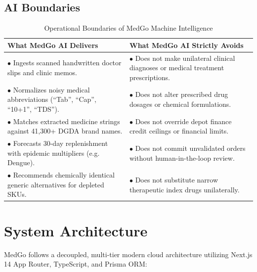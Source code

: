 \documentclass[10pt,a4paper]{article}
\begin{document}
\subsection{AI Boundaries}
\begin{table}[h!]
\centering
\small
\begin{tabularx}{\textwidth}{p{7.5cm}X}
\toprule
\textbf{What MedGo AI Delivers} & \textbf{What MedGo AI Strictly Avoids} \\
\midrule
$\bullet$ Ingests scanned handwritten doctor slips and clinic memos. & $\bullet$ Does not make unilateral clinical diagnoses or medical treatment prescriptions. \\
$\bullet$ Normalizes noisy medical abbreviations (``Tab'', ``Cap'', ``10+1'', ``TDS''). & $\bullet$ Does not alter prescribed drug dosages or chemical formulations. \\
$\bullet$ Matches extracted medicine strings against 41,300+ DGDA brand names. & $\bullet$ Does not override depot finance credit ceilings or financial limits. \\
$\bullet$ Forecasts 30-day replenishment with epidemic multipliers (e.g. Dengue). & $\bullet$ Does not commit unvalidated orders without human-in-the-loop review. \\
$\bullet$ Recommends chemically identical generic alternatives for depleted SKUs. & $\bullet$ Does not substitute narrow therapeutic index drugs unilaterally. \\
\bottomrule
\end{tabularx}
\caption{Operational Boundaries of MedGo Machine Intelligence}
\end{table}

\section{System Architecture}
MedGo follows a decoupled, multi-tier modern cloud architecture utilizing Next.js 14 App Router, TypeScript, and Prisma ORM:
\end{document}
